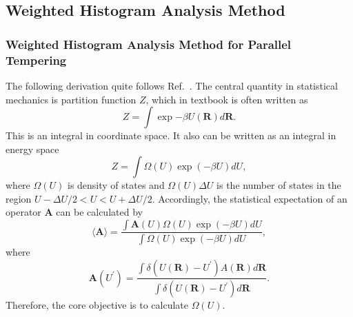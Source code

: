 \subsection{Weighted Histogram Analysis Method\label{Sec:FEM:WHAM}}
\subsubsection{Weighted Histogram Analysis Method for Parallel Tempering\label{Sec:FEM:WHAM_REMD}}
The following derivation quite follows Ref.~\cite{ChoderaJCTC2007}.
The central quantity in statistical mechanics is partition function $Z$, which in textbook is often written as
\begin{equation}
Z=\int \exp{-\beta U(\mathbf{R})}d\mathbf{R}.
\end{equation}
This is an integral in coordinate space. It also can be written as an integral in energy space
\begin{equation}
Z=\int \Omega(U)\exp{(-\beta U)}dU,
\end{equation}
where $\Omega(U)$ is density of states and $\Omega(U)\Delta U$ is the number of states in the region $U-\Delta U/2<U<U+\Delta U/2$. Accordingly, the statistical expectation of an operator $\mathbf{A}$ can be calculated by
\begin{equation}
\langle \mathbf{A}\rangle=\frac {\int \mathbf{A}(U)\Omega(U)\exp{(-\beta U)}dU}{\int \Omega(U)\exp{(-\beta U)}dU},
\end{equation}
where
\begin{equation}
\mathbf{A}(U^\prime)=\frac{\int \delta (U(\mathbf{R})-U^\prime)A(\mathbf{R})d\mathbf{R}}{\int \delta (U(\mathbf{R})-U^\prime)d\mathbf{R}}.
\end{equation}
Therefore, the core objective is to calculate $\Omega(U)$.

